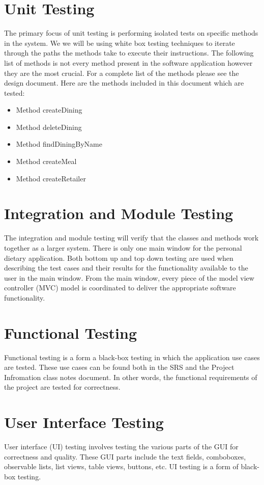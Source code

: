 \documentclass[table]{scrreprt}
\begin{document}
    \section{Unit Testing}
    The primary focus of unit testing is performing isolated tests on specific methods in the system. We we will be using white box testing techniques to iterate through the paths the methods take to execute their instructions. The following list of methods is not every method present in the software application however they are the most crucial. For a complete list of the methods please see the design document. Here are the methods included in this document which are tested: \\
    \begin{itemize}
    \item Method createDining
    \item Method deleteDining
    \item Method findDiningByName
    \item Method createMeal
    \item Method createRetailer
    \end{itemize}

    \section{Integration and Module Testing}
    
    The integration and module testing will verify that the classes and methods work together as a larger system. There is only one main window for the personal dietary application. Both bottom up and top down testing are used when describing the test cases and their results for the functionality available to the user in the main window. From the main window, every piece of the model view controller (MVC) model is coordinated to deliver the appropriate software functionality.

    \section{Functional Testing}
    Functional testing is a form a black-box testing in which the application use cases are tested. These use cases can be found both in the SRS and the Project Infromation class notes document. In other words, the functional requirements of the project are tested for correctness.

    \section{User Interface Testing}
    User interface (UI) testing involves testing the various parts of the GUI for correctness and quality. These GUI parts include the text fields, comboboxes, observable lists, list views, table views, buttons, etc. UI testing is a form of black-box testing.
\end{document}
